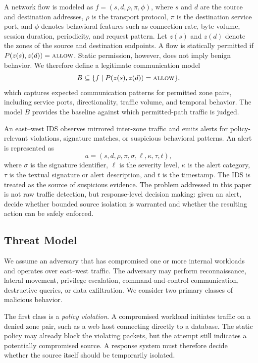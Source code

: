 \documentclass[final,5p]{elsarticle}
\begin{document}
A network flow is modeled as $f=(s,d,\rho,\pi,\phi)$, where $s$ and $d$ are the source and destination addresses, $\rho$ is the transport protocol, $\pi$ is the destination service port, and $\phi$ denotes behavioral features such as connection rate, byte volume, session duration, periodicity, and request pattern. Let $z(s)$ and $z(d)$ denote the zones of the source and destination endpoints. A flow is statically permitted if $P(z(s),z(d))=\textsc{allow}$. Static permission, however, does not imply benign behavior. We therefore define a legitimate communication model
\[
B \subseteq \{ f \mid P(z(s),z(d))=\textsc{allow}\},
\]
which captures expected communication patterns for permitted zone pairs, including service ports, directionality, traffic volume, and temporal behavior. The model $B$ provides the baseline against which permitted-path traffic is judged.

An east--west IDS observes mirrored inter-zone traffic and emits alerts for policy-relevant violations, signature matches, or suspicious behavioral patterns. An alert is represented as
\[
a=(s,d,\rho,\pi,\sigma,\ell,\kappa,\tau,t),
\]
where $\sigma$ is the signature identifier, $\ell$ is the severity level, $\kappa$ is the alert category, $\tau$ is the textual signature or alert description, and $t$ is the timestamp. The IDS is treated as the source of suspicious evidence. The problem addressed in this paper is not raw traffic detection, but response-level decision making: given an alert, decide whether bounded source isolation is warranted and whether the resulting action can be safely enforced.

\subsection{Threat Model}
\label{sec:threat_model}

We assume an adversary that has compromised one or more internal workloads and operates over east--west traffic. The adversary may perform reconnaissance, lateral movement, privilege escalation, command-and-control communication, destructive queries, or data exfiltration. We consider two primary classes of malicious behavior.

The first class is a \emph{policy violation}. A compromised workload initiates traffic on a denied zone pair, such as a web host connecting directly to a database. The static policy may already block the violating packets, but the attempt still indicates a potentially compromised source. A response system must therefore decide whether the source itself should be temporarily isolated.
\end{document}
